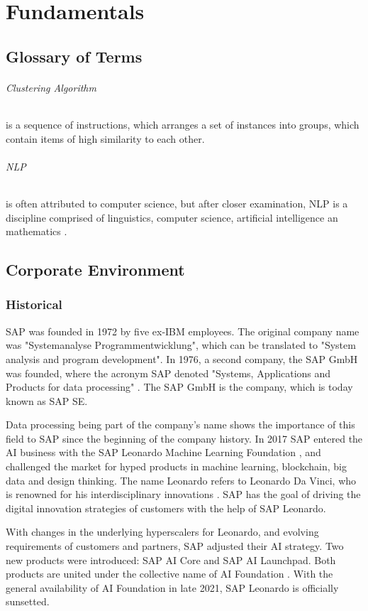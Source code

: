 \chapter{Fundamentals}
\section{Glossary of Terms}

	\subparagraph{Clustering Algorithm} is a sequence of instructions, which arranges a set of instances into groups, which contain items of high similarity to each other.
	\subparagraph{\ac{NLP}}is often attributed to computer science, but after closer examination, \ac{NLP} is a discipline comprised of linguistics, computer science, artificial intelligence an mathematics \cite{chowdhury2003}.

\section{Corporate Environment}

	\subsection{Historical}
	SAP was founded in 1972 by five ex-IBM employees. The original company name was "Systemanalyse Programmentwicklung", which can be translated to "System analysis and program development". In 1976, a second company, the SAP GmbH was founded, where the acronym SAP denoted "Systems, Applications and Products for data processing" \cite{GeschichteSAP1972}. The SAP GmbH is the company, which is today known as SAP SE. 
	
	Data processing being part of the company's name shows the importance of this field to SAP since the beginning of the company history.
	In 2017 SAP entered the AI business with the SAP Leonardo Machine Learning Foundation \cite{rutschmannSAPLeonardo2021}, and challenged the market for hyped products in machine learning, blockchain, big data and design thinking. The name Leonardo refers to Leonardo Da Vinci, who is renowned for his interdisciplinary innovations \cite{schmitzLeonardo}. SAP has the goal of driving the digital innovation strategies of customers with the help of SAP Leonardo.
	
	
	With changes in the underlying hyperscalers for Leonardo, and evolving requirements of customers and partners, SAP adjusted their AI strategy. Two new products were introduced: SAP AI Core and SAP AI Launchpad. Both products are united under the collective name of AI Foundation \cite{rutschmannSAPLeonardo2021}. With the general availability of AI Foundation in late 2021, SAP Leonardo is officially sunsetted.

